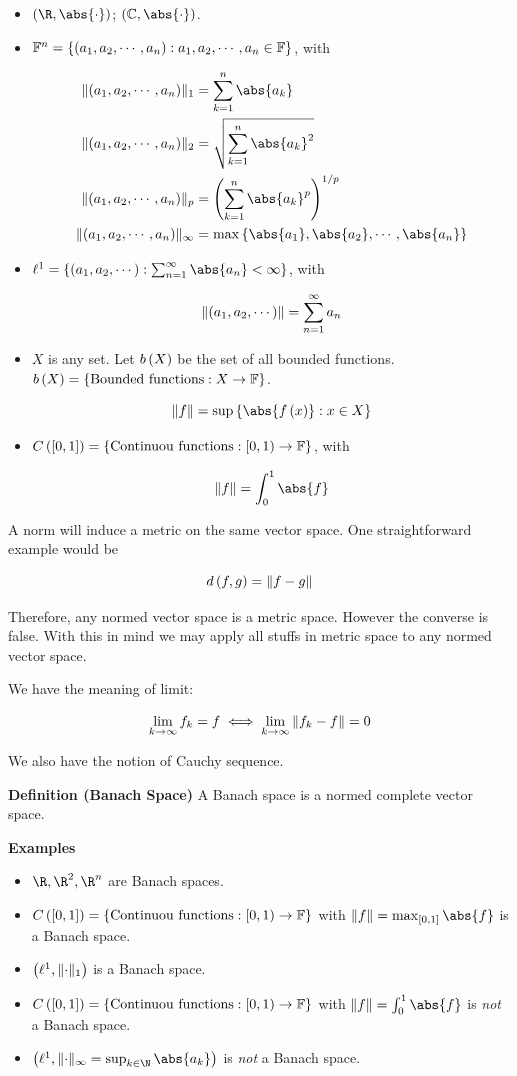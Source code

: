 \documentclass[
]{article}
\begin{document}
\begin{itemize}
\item
  \(\pr{\R,\abs{\cdot}}\); \(\pr{\mathbb C,\abs{\cdot}}\).
\item
  \(\F^n = \brace{\pr{a_1,a_2,\cdots,a_n}:a_1,a_2,\cdots,a_n\in \F}\),
  with

  \[\ba
  \norm{\pr{a_1,a_2,\cdots,a_n}}_1 & = \sum_{k = 1}^n\abs{a_k}\\
  \norm{\pr{a_1,a_2,\cdots,a_n}}_2 & = \sq{\sum_{k = 1}^n\abs{a_k}^2}\\
  \norm{\pr{a_1,a_2,\cdots,a_n}}_p & = \pr{\sum_{k = 1}^n\abs{a_k}^p}^{1/p}\\
  \norm{\pr{a_1,a_2,\cdots,a_n}}_{\infty} & = \max\brace{\abs{a_1},\abs{a_2},\cdots,\abs{a_n}} \\
  \ea\]
\item
  \(\ell^1 = \brace{\pr{a_1,a_2,\cdots}:\sinf[n]\abs{a_n}<\infty}\),
  with

  \[\norm{\pr{a_1,a_2,\cdots}} = \sinf[n]a_n\]
\item
  \(X\) is any set. Let \(b\pr{X}\) be the set of all bounded functions.
  \(b\pr{X} = \brace{\text{Bounded functions}: X\to \F}\).

  \[\norm{f} = \sup\brace{\abs{f\pr{x}}:x\in X}\]
\item
  \(C\pr{\br{0,1}} = \brace{\text{Continuou functions}:[0,1)\to\F}\),
  with

  \[\norm{f} = \int_0^1\abs{f}\]
\end{itemize}

A norm will induce a metric on the same vector space. One
straightforward example would be

\[d\pr{f,g} = \norm{f-g}\]

Therefore, any normed vector space is a metric space. However the
converse is false. With this in mind we may apply all stuffs in metric
space to any normed vector space.

We have the meaning of limit:

\[\lim_{k\to\infty}f_k = f\iff \lim_{k\to\infty}\norm{f_k-f} = 0\]

We also have the notion of Cauchy sequence.

\textbf{Definition (Banach Space)} A Banach space is a normed complete
vector space.

\textbf{Examples}

\begin{itemize}
\item
  \(\R,\R^2,\R^n\) are Banach spaces.
\item
  \(C\pr{\br{0,1}} = \brace{\text{Continuou functions}:[0,1)\to\F}\)
  with \(\norm{f} = \max_{\br{0,1}}\abs{f}\) is a Banach space.
\item
  \(\pr{\ell^1,\norm{\cdot}_1}\) is a Banach space.
\item
  \(C\pr{\br{0,1}} = \brace{\text{Continuou functions}:[0,1)\to\F}\)
  with \(\norm{f} = \int_0^1\abs{f}\) is \emph{not} a Banach space.
\item
  \(\pr{\ell^1,\norm{\cdot}_{\infty} = \sup_{k\in \N}\abs{a_k}}\) is
  \emph{not} a Banach space.
\end{itemize}
\end{document}
